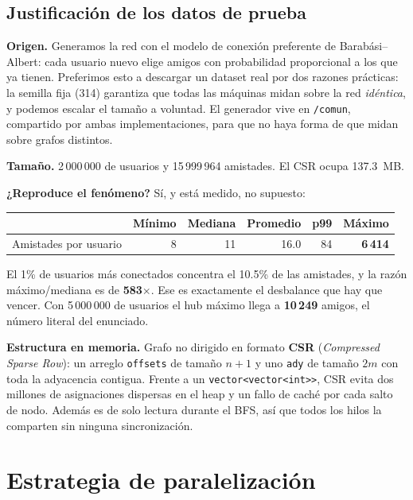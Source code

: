 \documentclass[11pt,a4paper]{article}
\begin{document}
\subsection*{Justificación de los datos de prueba}

\textbf{Origen.} Generamos la red con el modelo de conexión preferente de
Barabási--Albert: cada usuario nuevo elige amigos con probabilidad proporcional
a los que ya tienen. Preferimos esto a descargar un dataset real por dos
razones prácticas: la semilla fija (314) garantiza que todas las máquinas midan
sobre la red \emph{idéntica}, y podemos escalar el tamaño a voluntad. El
generador vive en \texttt{/comun}, compartido por ambas implementaciones, para
que no haya forma de que midan sobre grafos distintos.

\textbf{Tamaño.} 2\,000\,000 de usuarios y 15\,999\,964 amistades. El CSR ocupa
137.3~MB.

\textbf{¿Reproduce el fenómeno?} Sí, y está medido, no supuesto:

\begin{center}
\begin{tabular}{lrrrrr}
\toprule
& Mínimo & Mediana & Promedio & p99 & \textbf{Máximo} \\
\midrule
Amistades por usuario & 8 & 11 & 16.0 & 84 & \textbf{6\,414} \\
\bottomrule
\end{tabular}
\end{center}

El 1\% de usuarios más conectados concentra el 10.5\% de las amistades, y la
razón máximo/mediana es de \textbf{583$\times$}. Ese es exactamente el
desbalance que hay que vencer. Con 5\,000\,000 de usuarios el hub máximo llega
a \textbf{10\,249} amigos, el número literal del enunciado.

\textbf{Estructura en memoria.} Grafo no dirigido en formato \textbf{CSR}
(\emph{Compressed Sparse Row}): un arreglo \texttt{offsets} de tamaño $n+1$ y
uno \texttt{ady} de tamaño $2m$ con toda la adyacencia contigua. Frente a un
\texttt{vector<vector<int>>}, CSR evita dos millones de asignaciones dispersas
en el heap y un fallo de caché por cada salto de nodo. Además es de solo
lectura durante el BFS, así que todos los hilos la comparten sin ninguna
sincronización.

\section{Estrategia de paralelización}
\end{document}
